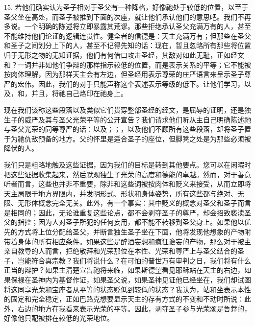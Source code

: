 15. 若他们确实认为圣子相对于圣父有一种降格，好像祂处于较低的位置，以至于圣父坐在高处，而圣子被推到下面的次座，就让他们承认他们的意思吧。我们不再多说。一个明确的陈述将立即暴露其荒谬。那些拒绝承认圣父充满万有的人，甚至不能维持他们论证的逻辑连贯性。健全者的信德是：天主充满万有；但那些在圣父和圣子之间划分上下的人，甚至不记得先知的话：现在，暂且忽略所有那些将位置归于无形之物的无知证据，他们有何借口攻击圣经，其敌对如此无耻，正如经文和？一词并非如他们争辩的那样指示较低的位置，而是表示关系的平等；它不能被按肉体理解，因为那样天主会有左边，但圣经用表示尊荣的庄严语言来呈示圣子尊严的宏伟。因此，我们的对手只能声称这个表述表示等级的低下。让他们学习，以及，和，并且，将祂自己烙印在祂身上。\par

现在我们该称这些段落以及类似它们贯穿整部圣经的经文，是屈辱的证明，还是独生子的威严及其与圣父光荣平等的公开宣告？我们请求他们听从主自己明确陈述祂与圣父光荣的同等尊严的话：以及；；，以及他们不顾所有这些段落，却将圣子置于为祂仇敌预备的地方。父的怀里是适合圣子的座位，但脚凳之处是为那些必须被降伏的人。\par

我们只是粗略地触及这些证据，因为我们的目标是转到其他要点。您可以在闲暇时把这些证据收集起来，然后默观独生子光荣的高度和德能的卓越。然而，对于善意听者而言，这些也并非不重要，除非和这些词被按肉体和贬义来接受，从而立即将天主局限于地方界限内，并发明形式、形状和身体姿势，所有这些都与绝对、无限、无形体概念完全无关。此外，有一个事实：其中贬义的概念对圣父和圣子而言是相同的；因此，无论谁重复这些论点，都不会剥夺圣子的尊严，却会招致亵渎圣父的指控；因为人对圣子所犯的任何妄用，都不能不转移到圣父身上。如果他以优先的方式将上位分配给圣父，并断言独生圣子坐在下面，他将发现他想象的产物附带着身体的所有相应条件。如果这些是醉酒妄想和疯狂谵妄的产物，那么对于被主亲自教导的人而言，拒绝敬拜和光荣那位在本性、光荣和尊严上与圣父结合的圣子，岂能符合真宗教？我们将说什么？在可怕的普世万有审判之日，我们将有什么正当的辩护？如果主清楚宣告祂将来临，如果斯德望看见耶稣站在天主的右边，如果保禄在圣神内为基督作证，如果圣父说，如果圣神见证他已经坐在，我们却试图将这同享光荣和宝座者从平等的状态贬低到较低的状态？我认为，站和坐表示本性的固定和完全稳定，正如巴路克想要显示天主的存有方式的不变和不动时所说：此外，右边的地方在我看来表示光荣的平等。因此，剥夺圣子参与光荣颂是鲁莽的，好像他只配被排在较低的光荣地位。\par

